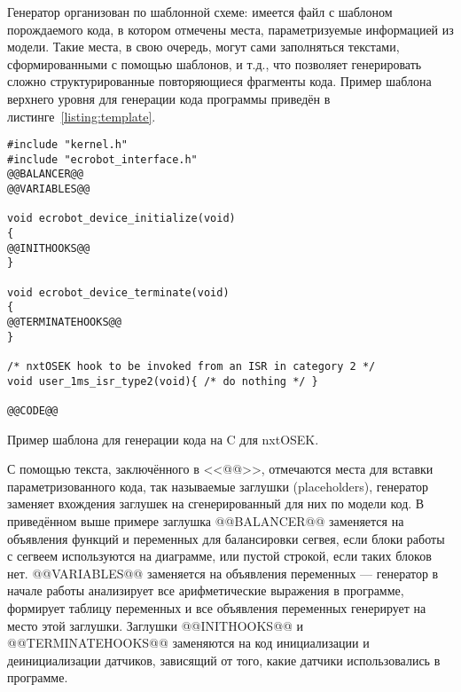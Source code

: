 Генератор организован по шаблонной схеме: имеется файл с шаблоном порождаемого кода, 
в котором отмечены места, параметризуемые информацией из модели. Такие места, в свою 
очередь, могут сами заполняться текстами, сформированными с помощью шаблонов, и т.д., 
что позволяет генерировать сложно структурированные  повторяющиеся фрагменты кода. 
Пример шаблона верхнего уровня для генерации кода программы приведён в листинге~\ref{listing:template}.

\begin{listing}
\begin{verbatim}
#include "kernel.h"
#include "ecrobot_interface.h"
@@BALANCER@@
@@VARIABLES@@

void ecrobot_device_initialize(void)
{
@@INITHOOKS@@
}

void ecrobot_device_terminate(void)
{
@@TERMINATEHOOKS@@
}

/* nxtOSEK hook to be invoked from an ISR in category 2 */
void user_1ms_isr_type2(void){ /* do nothing */ }

@@CODE@@
\end{verbatim}
\caption{Пример шаблона для генерации кода на C для nxtOSEK.}
\label{listing:template}
\end{listing}

С помощью текста, заключённого в <<@@>>, отмечаются места для вставки параметризованного 
кода, так называемые заглушки (placeholders), генератор заменяет вхождения заглушек 
на сгенерированный для них по модели код. В приведённом выше примере заглушка @@BALANCER@@ 
заменяется на объявления функций и переменных для балансировки сегвея, если блоки 
работы с сегвеем используются на диаграмме, или пустой строкой, если таких блоков нет. 
@@VARIABLES@@ заменяется на объявления переменных --- генератор в начале работы анализирует 
все арифметические выражения в программе, формирует таблицу переменных и все объявления 
переменных генерирует на место этой заглушки. Заглушки @@INITHOOKS@@ и @@TERMINATEHOOKS@@ 
заменяются на код инициализации и деинициализации датчиков, зависящий от того, какие 
датчики использовались в программе. 

